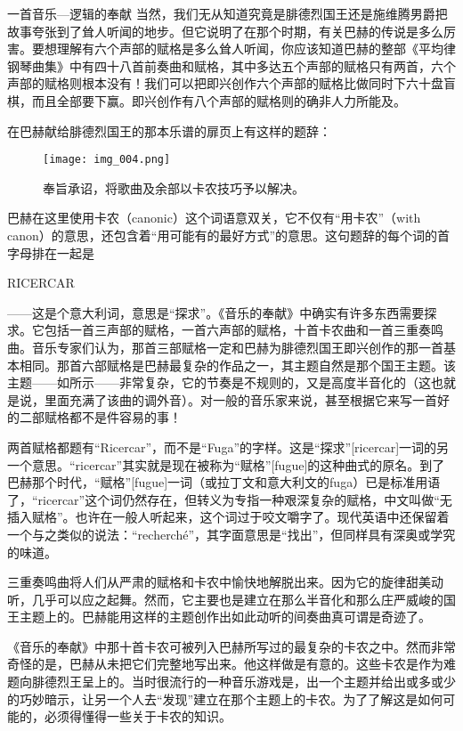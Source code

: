 \begin{intro}{一首音乐—逻辑的奉献}
当然，我们无从知道究竟是腓德烈国王还是施维腾男爵把故事夸张到了耸人听闻的地步。但它说明了在那个时期，有关巴赫的传说是多么厉害。要想理解有六个声部的赋格是多么耸人听闻，你应该知道巴赫的整部《平均律钢琴曲集》中有四十八首前奏曲和赋格，其中多达五个声部的赋格只有两首，六个声部的赋格则根本没有！我们可以把即兴创作六个声部的赋格比做同时下六十盘盲棋，而且全部要下赢。即兴创作有八个声部的赋格则的确非人力所能及。

在巴赫献给腓德烈国王的那本乐谱的扉页上有这样的题辞：
\begin{figure}[H]
\texttt{[image: img\_004.png]}
\caption[巴赫的字首字母组合“RICERCAR”。]
  {奉旨承诏，将歌曲及余部以卡农技巧予以解决。}
\end{figure}
\noindent 巴赫在这里使用卡农（canonic）这个词语意双关，它不仅有“用卡农”（with canon）的意思，还包含着“用可能有的最好方式”的意思。这句题辞的每个词的首字母排在一起是
\begin{center}
RICERCAR
\end{center}
——这是个意大利词，意思是“探求”。《音乐的奉献》中确实有许多东西需要探求。它包括一首三声部的赋格，一首六声部的赋格，十首卡农曲和一首三重奏鸣曲。音乐专家们认为，那首三部赋格一定和巴赫为腓德烈国王即兴创作的那一首基本相同。那首六部赋格是巴赫最复杂的作品之一，其主题自然是那个国王主题。该主题——如所示——非常复杂，它的节奏是不规则的，又是高度半音化的（这也就是说，里面充满了该曲的调外音）。对一般的音乐家来说，甚至根据它来写一首好的二部赋格都不是件容易的事！

两首赋格都题有“Ricercar”，而不是“Fuga”的字样。这是“探求”[ricercar]一词的另一个意思。“ricercar”其实就是现在被称为“赋格”[fugue]的这种曲式的原名。到了巴赫那个时代，“赋格”[fugue]一词（或拉丁文和意大利文的fuga）已是标准用语了，“ricercar”这个词仍然存在，但转义为专指一种艰深复杂的赋格，中文叫做“无插入赋格”。也许在一般人听起来，这个词过于咬文嚼字了。现代英语中还保留着一个与之类似的说法：“recherché”，其字面意思是“找出”，但同样具有深奥或学究的味道。

三重奏鸣曲将人们从严肃的赋格和卡农中愉快地解脱出来。因为它的旋律甜美动听，几乎可以应之起舞。然而，它主要也是建立在那么半音化和那么庄严威峻的国王主题上的。巴赫能用这样的主题创作出如此动听的间奏曲真可谓是奇迹了。

《音乐的奉献》中那十首卡农可被列入巴赫所写过的最复杂的卡农之中。然而非常奇怪的是，巴赫从未把它们完整地写出来。他这样做是有意的。这些卡农是作为难题向腓德烈王呈上的。当时很流行的一种音乐游戏是，出一个主题并给出或多或少的巧妙暗示，让另一个人去“发现”建立在那个主题上的卡农。为了了解这是如何可能的，必须得懂得一些关于卡农的知识。


\end{intro}
